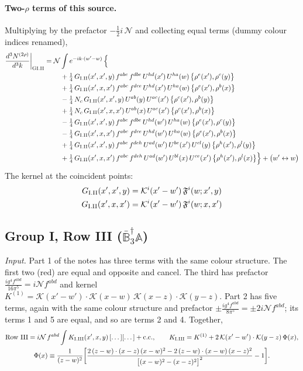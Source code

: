 \documentclass[10pt]{article}
\numberwithin{equation}{section}
\newcommand{\KK}{\mathcal K}
\newcommand{\NN}{\mathcal N}
\begin{document}
\paragraph{Two-$\rho$ terms of this source.} Multiplying by the prefactor $-\tfrac12i\,\NN$ and collecting equal terms (dummy colour indices renamed),
\begin{align}
\frac{d^3N^{(2\rho)}}{d^3k}\bigg|_{\rm GI.II}={}&\NN\int e^{-ik\cdot(w'-w)}\,\Big\{\notag\\
&\quad +\tfrac14\,G_{\rm I.II}(x',x',y)\,f^{abc}\,f^{dbe}\,U^{hd}(x')\,U^{ha}(w)\,\big\{\rho^{e}(x'),\rho^{c}(y)\big\}\notag\\
&\quad +\tfrac14\,G_{\rm I.II}(x',x,x')\,f^{abc}\,f^{dce}\,U^{hd}(x')\,U^{ha}(w)\,\big\{\rho^{e}(x'),\rho^{b}(x)\big\}\notag\\
&\quad -\tfrac14\,N_{c}\,G_{\rm I.II}(x',x',y)\,U^{ab}(y)\,U^{ac}(x')\,\big\{\rho^{c}(x'),\rho^{b}(y)\big\}\notag\\
&\quad +\tfrac14\,N_{c}\,G_{\rm I.II}(x',x,x')\,U^{ab}(x)\,U^{ac}(x')\,\big\{\rho^{c}(x'),\rho^{b}(x)\big\}\notag\\
&\quad -\tfrac14\,G_{\rm I.II}(x',x',y)\,f^{abc}\,f^{dbe}\,U^{hd}(w')\,U^{ha}(w)\,\big\{\rho^{e}(x'),\rho^{c}(y)\big\}\notag\\
&\quad -\tfrac14\,G_{\rm I.II}(x',x,x')\,f^{abc}\,f^{dce}\,U^{hd}(w')\,U^{ha}(w)\,\big\{\rho^{e}(x'),\rho^{b}(x)\big\}\notag\\
&\quad +\tfrac14\,G_{\rm I.II}(x',x',y)\,f^{abc}\,f^{deh}\,U^{ad}(w')\,U^{be}(x')\,U^{cl}(y)\,\big\{\rho^{h}(x'),\rho^{l}(y)\big\}\notag\\
&\quad +\tfrac14\,G_{\rm I.II}(x',x,x')\,f^{abc}\,f^{deh}\,U^{ad}(w')\,U^{bl}(x)\,U^{ce}(x')\,\big\{\rho^{h}(x'),\rho^{l}(x)\big\}\Big\}+\big(w'\leftrightarrow w\big)\label{R:eq:res-GI.II}
\end{align}
The kernel at the coincident points:
\begin{align*}
G_{\rm I.II}(x',x',y)&=\KK^{i}(x'-w')\,\mathfrak F^{i}(w;x',y)\\G_{\rm I.II}(x',x,x')&=\KK^{i}(x'-w')\,\mathfrak F^{i}(w;x,x')
\end{align*}
\subsection{Group I, Row III ($\bar{\mathbb B}_3^\dagger\mathbb A$)}\label{R:sec:GI.III}
\emph{Input.} Part 1 of the notes has three terms with the same colour structure. The first two (red) are equal and opposite and cancel. The third has prefactor $\frac{ig^4f^{abd}}{16\pi^5}=i\NN f^{abd}$ and kernel $K^{(1)}=\KK(x'-w')\cdot\KK(x-w)\,\KK(x-z)\cdot\KK(y-z)$. Part 2 has five terms, again with the same colour structure and prefactor $\pm\frac{ig^4f^{abd}}{8\pi^5}=\pm2i\NN f^{abd}$; its terms 1 and 5 are equal, and so are terms 2 and 4. Together,
\begin{gather*}
\text{Row III}=i\NN\,f^{abd}\int K_{\rm I.III}(x',x,y)\,[\dots][\dots]+{\rm c.c.},\qquad K_{\rm I.III}=K^{(1)}+2\,\KK(x'-w')\cdot\KK(y-z)\,\Phi(x),\\
\Phi(x)\equiv\frac{1}{(z-w)^2}\bigg[\frac{2\,(z-w)\cdot(x-z)\,(x-w)^2-2\,(z-w)\cdot(x-w)\,(x-z)^2}{\big[(x-w)^2-(x-z)^2\big]^2}-1\bigg].
\end{gather*}
\end{document}
